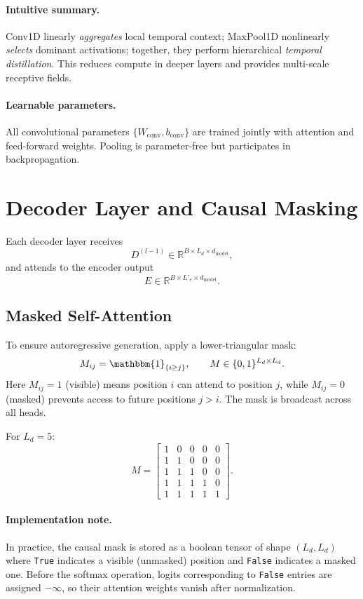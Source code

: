 \documentclass[11pt]{article}
\begin{document}
\paragraph{Intuitive summary.}
Conv1D linearly \emph{aggregates} local temporal context; MaxPool1D nonlinearly \emph{selects} dominant activations; together, they perform hierarchical \emph{temporal distillation}. This reduces compute in deeper layers and provides multi-scale receptive fields.

\paragraph{Learnable parameters.}
All convolutional parameters $\{W_{\text{conv}}, b_{\text{conv}}\}$ are trained jointly with attention and feed-forward weights. Pooling is parameter-free but participates in backpropagation.

\section{Decoder Layer and Causal Masking}

Each decoder layer receives
\[
D^{(l-1)} \in \mathbb{R}^{B \times L_d \times d_{\text{model}}},
\]
and attends to the encoder output
\[
E \in \mathbb{R}^{B \times L'_e \times d_{\text{model}}}.
\]

\subsection{Masked Self-Attention}

To ensure autoregressive generation, apply a lower-triangular mask:
\[
M_{ij} = \mathbbm{1}_{\{i \ge j\}},
\qquad
M \in \{0,1\}^{L_d \times L_d}.
\]
Here $M_{ij}=1$ (visible) means position $i$ can attend to position $j$, while $M_{ij}=0$ (masked) prevents access to future positions $j>i$. The mask is broadcast across all heads.

For $L_d=5$:
\[
M =
\begin{bmatrix}
1 & 0 & 0 & 0 & 0\\
1 & 1 & 0 & 0 & 0\\
1 & 1 & 1 & 0 & 0\\
1 & 1 & 1 & 1 & 0\\
1 & 1 & 1 & 1 & 1
\end{bmatrix}.
\]
\paragraph{Implementation note.}
In practice, the causal mask is stored as a boolean tensor of shape $(L_d, L_d)$
where \texttt{True} indicates a visible (unmasked) position and \texttt{False} indicates a masked one.
Before the softmax operation, logits corresponding to \texttt{False} entries are assigned $-\infty$,
so their attention weights vanish after normalization.
\end{document}
